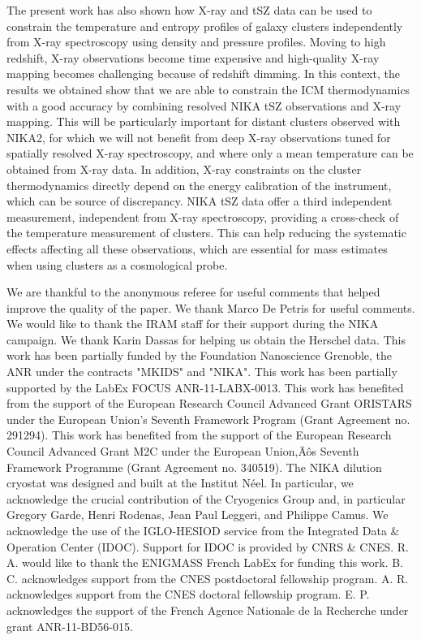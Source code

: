 \documentclass[traditabstract]{aa}
\begin{document}
The present work has also shown how X-ray and tSZ data can be used to constrain the temperature and entropy profiles of galaxy clusters independently from X-ray spectroscopy using  density and pressure profiles. Moving to high redshift, X-ray observations become time expensive and high-quality X-ray mapping becomes challenging because of  redshift dimming. In this context, the results we obtained show that we are able to constrain the ICM thermodynamics with a good accuracy by combining resolved NIKA tSZ observations and X-ray mapping. This will be particularly important for distant clusters observed with NIKA2, for which we will not benefit from deep X-ray observations tuned for spatially resolved X-ray spectroscopy, and where only a mean temperature can be obtained from X-ray data. In addition, X-ray constraints on the cluster thermodynamics directly depend on the energy calibration of the instrument, which can be source of discrepancy. NIKA tSZ data offer a third independent measurement, independent from X-ray spectroscopy, providing a cross-check of the temperature measurement of clusters. This can help reducing the systematic effects affecting all these observations, which are essential for mass estimates when using clusters as a cosmological probe.

\begin{acknowledgements}
We are thankful to the anonymous referee for useful comments that helped improve the quality of the paper.
We thank Marco De Petris for useful comments.
We would like to thank the IRAM staff for their support during the NIKA campaign.
We thank Karin Dassas for helping us obtain the Herschel data.
This work has been partially funded by the Foundation Nanoscience Grenoble, the ANR under the contracts "MKIDS" and "NIKA". 
This work has been partially supported by the LabEx FOCUS ANR-11-LABX-0013. 
This work has benefited from the support of the European Research Council Advanced Grant ORISTARS under the European Union's Seventh Framework Program (Grant Agreement no. 291294).
This work has benefited from the support of the European Research Council Advanced Grant M2C under the European Union‚Äôs Seventh Framework Programme (Grant Agreement no. 340519).
The NIKA dilution cryostat was designed and built at the Institut N\'eel. In particular, we acknowledge the crucial contribution of the Cryogenics Group and, in particular Gregory Garde, Henri Rodenas, Jean Paul Leggeri, and Philippe Camus. 
We acknowledge the use of the IGLO-HESIOD service from the Integrated Data \& Operation Center (IDOC). Support for IDOC is provided by CNRS \& CNES. 
R. A. would like to thank the ENIGMASS French LabEx for funding this work. 
B. C. acknowledges support from the CNES postdoctoral fellowship program. 
A. R. acknowledges support from the CNES doctoral fellowship program. 
E. P. acknowledges the support of the French Agence Nationale de la Recherche under grant ANR-11-BD56-015.
\end{acknowledgements}


\end{document}
